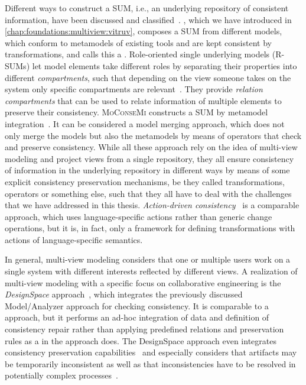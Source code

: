 Different ways to construct a \gls{SUM}, i.e., an underlying repository of consistent information, have been discussed and classified~.
\vitruv, which we have introduced in \autoref{chap:foundations:multiview:vitruv}, composes a \gls{SUM} from different models, which conform to metamodels of existing tools and are kept consistent by transformations, and calls this a \vsum.
Role-oriented single underlying models (R-SUMs) let model elements take different roles by separating their properties into different \emph{compartments}, such that depending on the view someone takes on the system only specific compartments are relevant~\cite{werner2018rsum-SEAA, werner2018rsum-MRT}.
They provide \emph{relation compartments} that can be used to relate information of multiple elements to preserve their consistency.
\textsc{MoConseMi} constructs a \gls{SUM} by metamodel integration~\cite{meier2019MoConseMi-Models}.
It can be considered a model merging approach, which does not only merge the models but also the metamodels by means of operators that check and preserve consistency.
While all these approach rely on the idea of multi-view modeling and project views from a single repository, they all ensure consistency of information in the underlying repository in different ways by means of some explicit consistency preservation mechanisms, be they called transformations, operators or something else, such that they all have to deal with the challenges that we have addressed in this thesis.
\emph{Action-driven consistency}~\cite{ali2020ActionDrivenConsistency-SAM} is a comparable approach, which uses language-specific actions rather than generic change operations, but it is, in fact, only a framework for defining transformations with actions of language-specific semantics.

In general, multi-view modeling considers that one or multiple users work on a single system with different interests reflected by different views.
A realization of multi-view modeling with a specific focus on collaborative engineering is the \emph{DesignSpace} approach~\cite{demuth2015designSpace-SAC,egyed2019consistencyArtifacts-Computer}, which integrates the previously discussed Model/Analyzer approach for checking consistency.
It is comparable to a \vsum approach, but it performs an ad-hoc integration of data and definition of consistency repair rather than applying predefined relations and preservation rules as a \vsum in the \vitruv approach does.
The DesignSpace approach even integrates consistency preservation capabilities~\cite{troels2019liveconsistency-SAC, khelladi2019sideeffects-SLE} and especially considers that artifacts may be temporarily inconsistent as well as that inconsistencies have to be resolved in potentially complex processes~\cite{kretschmer2020ConsistentChangePropagation-SoSym}.

